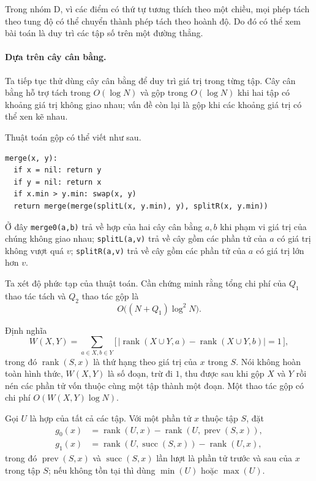 \documentclass[11pt]{article}
\begin{document}
Trong nhóm D, vì các điểm có thứ tự tương thích theo một chiều, mọi phép tách
theo tung độ có thể chuyển thành phép tách theo hoành độ. Do đó có thể xem bài
toán là duy trì các tập số trên một đường thẳng.

\paragraph{Dựa trên cây cân bằng.}
Ta tiếp tục thử dùng cây cân bằng để duy trì giá trị trong từng tập. Cây cân
bằng hỗ trợ tách trong \(O(\log N)\) và gộp trong \(O(\log N)\) khi hai tập có
khoảng giá trị không giao nhau; vấn đề còn lại là gộp khi các khoảng giá trị có
thể xen kẽ nhau.

Thuật toán gộp có thể viết như sau.
\begin{verbatim}
merge(x, y):
  if x = nil: return y
  if y = nil: return x
  if x.min > y.min: swap(x, y)
  return merge(merge(splitL(x, y.min), y), splitR(x, y.min))
\end{verbatim}

Ở đây \texttt{merge0(a,b)} trả về hợp của hai cây cân bằng \(a,b\) khi phạm vi
giá trị của chúng không giao nhau; \texttt{splitL(a,v)} trả về cây gồm các phần
tử của \(a\) có giá trị không vượt quá \(v\); \texttt{splitR(a,v)} trả về cây
gồm các phần tử của \(a\) có giá trị lớn hơn \(v\).

Ta xét độ phức tạp của thuật toán. Cần chứng minh rằng tổng chi phí của \(Q_1\)
thao tác tách và \(Q_2\) thao tác gộp là
\[
  O\bigl((N+Q_1)\log^2 N\bigr).
\]

Định nghĩa
\[
  W(X,Y)=\sum_{a\in X,b\in Y}
  \bigl[\,|\operatorname{rank}(X\cup Y,a)-
  \operatorname{rank}(X\cup Y,b)|=1\,\bigr],
\]
trong đó \(\operatorname{rank}(S,x)\) là thứ hạng theo giá trị của \(x\) trong
\(S\). Nói không hoàn toàn hình thức, \(W(X,Y)\) là số đoạn, trừ đi \(1\), thu
được sau khi gộp \(X\) và \(Y\) rồi nén các phần tử vốn thuộc cùng một tập thành
một đoạn. Một thao tác gộp có chi phí \(O(W(X,Y)\log N)\).

Gọi \(U\) là hợp của tất cả các tập. Với một phần tử \(x\) thuộc tập \(S\), đặt
\[
\begin{aligned}
g_0(x)&=\operatorname{rank}(U,x)-
       \operatorname{rank}(U,\operatorname{prev}(S,x)),\\
g_1(x)&=\operatorname{rank}(U,\operatorname{succ}(S,x))-
       \operatorname{rank}(U,x),
\end{aligned}
\]
trong đó \(\operatorname{prev}(S,x)\) và \(\operatorname{succ}(S,x)\) lần lượt
là phần tử trước và sau của \(x\) trong tập \(S\); nếu không tồn tại thì dùng
\(\min(U)\) hoặc \(\max(U)\).
\end{document}
